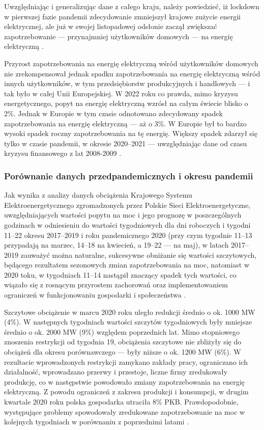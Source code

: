 \documentclass[polish, twoside, 12pt, a4paper]{article}
\theoremstyle{definition}
\theoremstyle{plain}
\theoremstyle{remark}
\begin{document}
Uwzględniając i generalizując dane z całego kraju, należy powiedzieć, iż lockdown w pierwszej fazie pandemii zdecydowanie zmniejszył krajowe zużycie energii elektrycznej, ale już w swojej listopadowej odsłonie zaczął zwiększać zapotrzebowanie --- przynajmniej użytkowników domowych --- na energię elektryczną \citep{kazimierska2023}.

Przyrost zapotrzebowania na energię elektryczną wśród użytkowników domowych nie zrekompensował jednak spadku zapotrzebowania na energię elektryczną wśród innych użytkowników, w tym przedsiębiorstw produkcyjnych i handlowych --- i tak było w całej Unii Europejskiej. W 2022 roku co prawda, mimo kryzysu energetycznego, popyt na energię elektryczną wzrósł na całym świecie blisko o 2\%. Jednak w Europie w tym czasie odnotowano zdecydowany spadek zapotrzebowania na energię elektryczną --- aż o 3\%. W Europie był to bardzo wysoki spadek roczny zapotrzebowania na tę energię. Większy spadek zdarzył się tylko w czasie pandemii, w okresie 2020--2021 --- uwzględniając dane od czasu kryzysu finansowego z lat 2008-2009 \citep{maciuch2023}.  

\subsubsection{Porównanie danych przedpandemicznych i okresu pandemii}

Jak wynika z analizy danych obciążenia Krajowego Systemu Elektroenergetycznego zgromadzonych przez Polskie Sieci Elektroenergetyczne, uwzględniających wartości popytu na moc i jego prognozę w poszczególnych godzinach w odniesieniu do wartości tygodniowych dla dni roboczych i tygodni 11--22 okresu 2017--2019 i roku pandemicznego 2020 (przy czym tygodnie 11--13 przypadają na marzec, 14--18 na kwiecień, a 19--22 --- na maj), w latach 2017--2019 zauważyć można naturalne, sukcesywne obniżanie się wartości szczytowych, będącego rezultatem sezonowych zmian zapotrzebowania na moc, natomiast w 2020 toku, w tygodniach 11--14 nastąpił znaczący spadek tych wartości, co wiązało się z rosnącym przyrostem zachorowań oraz implementowaniem ograniczeń w funkcjonowaniu gospodarki i społeczeństwa \citep{stahl2021}. 

Szczytowe obciążenie w marcu 2020 roku uległo redukcji średnio o ok. 1000 MW (4\%). W następnych tygodniach wartości szczytów tygodniowych były mniejsze średnio o ok. 2000 MW (9\%) względem poprzednich lat. Mimo stopniowego znoszenia restrykcji od tygodnia 19, obciążenia szczytowe nie zbliżyły się do obciążeń dla okresu porównawczego --- były niższe o ok. 1200 MW (6\%). W rezultacie wprowadzonych restrykcji zamykano zakłady pracy, ograniczano ich działalność, wprowadzano przerwy i przestoje, liczne firmy zredukowały produkcję, co w następstwie powodowało zmiany zapotrzebowania na energię elektryczną. Z powodu ograniczeń z zakresu produkcji i konsumpcji, w drugim kwartale 2020 roku polska gospodarka utraciła 8\% PKB. Prawdopodobnie, występujące problemy spowodowały zredukowane zapotrzebowanie na moc w kolejnych tygodniach w porównaniu z poprzednimi latami \citep{stahl2021}. 
\end{document}
